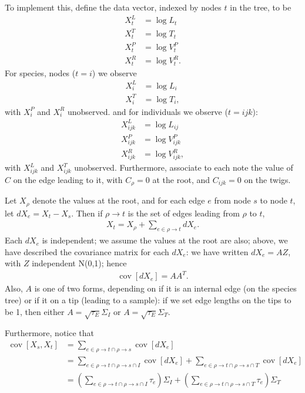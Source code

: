 \documentclass{article}
\DeclareMathOperator{\cov}{cov}
\begin{document}
To implement this, define the data vector, indexed by nodes $t$ in the tree, to be
\begin{align}
    X^L_t &= \log L_t \\
    X^T_t &= \log T_t \\
    X^P_t &= \log V^P_t \\
    X^R_t &= \log V^R_t .
\end{align}
For species, nodes ($t=i$) we observe
\begin{align}
    X^L_i &= \log L_i \\
    X^T_i &= \log T_i ,
\end{align}
with $X^P_i$ and $X^R_i$ unobserved.
and for individuals we observe ($t={ijk}$):
\begin{align}
    X^L_{ijk} &= \log L_{ij} \\
    X^P_{ijk} &= \log V^P_{ijk} \\
    X^R_{ijk} &= \log V^R_{ijk} ,
\end{align}
with $X^L_{ijk}$ and $X^T_{ijk}$ unobserved.
Furthermore, associate to each note the value of $C$ on the edge leading to it,
with $C_\rho=0$ at the root, and $C_{ijk}=0$ on the twigs.

Let $X_\rho$ denote the values at the root, 
and for each edge $e$ from node $s$ to node $t$, let $dX_e = X_t - X_s$.
Then if $\rho \to t$ is the set of edges leading from $\rho$ to $t$, 
\begin{align}
    X_t = X_\rho + \sum_{e \in \rho \to t} dX_e .
\end{align}
Each $dX_e$ is independent; we assume the values at the root are also;
above, we have described the covariance matrix for each $dX_e$:
we have written $dX_e = A Z$, with $Z$ independent N(0,1);
hence 
\begin{align}
    \cov[dX_e] = A A^T .
\end{align}
Also, $A$ is one of two forms, depending on if it is an internal edge (on the species tree)
or if it on a tip (leading to a sample): 
if we set edge lengths on the tips to be 1,
then either $A = \sqrt{\tau_E} \Sigma_I$ or $A=\sqrt{\tau_E} \Sigma_T$.

Furthermore, notice that 
\begin{align}
  \cov[X_s,X_t] &= \sum_{e \in \rho \to t \cap \rho \to s } \cov[dX_e] \\
    &= \sum_{e \in \rho \to t \cap \rho \to s \cap I } \cov[dX_e] 
      + \sum_{e \in \rho \to t \cap \rho \to s \cap T } \cov[dX_e] \\
    &= \left( \sum_{e \in \rho \to t \cap \rho \to s \cap I } \tau_e \right) \Sigma_I
      + \left( \sum_{e \in \rho \to t \cap \rho \to s \cap T } \tau_e \right) \Sigma_T 
\end{align}
\end{document}
